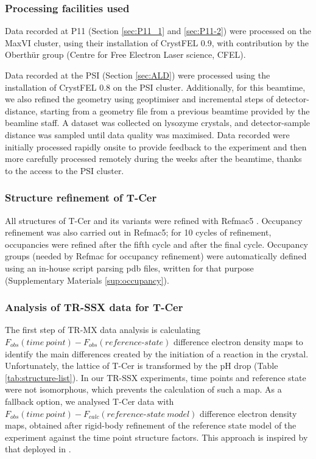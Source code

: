 \subsubsection{Processing facilities used}

Data recorded at P11 (Section \ref{sec:P11_1} and \ref{sec:P11-2}) were processed on the MaxVI cluster, using their installation of CrystFEL 0.9, with contribution by the Oberthür group (Centre for Free Electron Laser science, CFEL). 

Data recorded at the PSI (Section \ref{sec:ALD}) were processed using the installation of CrystFEL 0.8 on the PSI cluster. Additionally, for this beamtime, we also refined the geometry using geoptimiser and incremental steps of detector-distance, starting from a geometry file from a previous beamtime provided by the beamline staff. A dataset was collected on lysozyme crystals, and detector-sample distance was sampled until data quality was maximised. Data recorded were initially processed rapidly onsite to provide feedback to the experiment and then more carefully processed remotely during the weeks after the beamtime, thanks to the access to the PSI cluster.

\subsubsection{Structure refinement of T-Cer}
All structures of T-Cer and its variants were refined with Refmac5 \parencite{murshudovRefinementMacromolecularStructures1997}. Occupancy refinement was also carried out in Refmac5; for 10 cycles of refinement, occupancies were refined after the fifth cycle and after the final cycle. Occupancy groups (needed by Refmac for occupancy refinement) were automatically defined using an in-house script parsing pdb files, written for that purpose (Supplementary Materials \ref{sup:occupancy}).

\subsubsection{Analysis of TR-SSX data for T-Cer}\label{sec:TRSSXanalysis}
The first step of TR-MX data analysis is calculating \(F_{obs}(time\ point) - F_{obs}(reference\mbox{-}state)\) difference electron density maps to identify the main differences created by the initiation of a reaction in the crystal. Unfortunately, the lattice of T-Cer is transformed by the pH drop (Table \ref{tab:structure-list}). In our TR-SSX experiments, time points and reference state were not isomorphous, which prevents the calculation of such a map. As a fallback option, we analysed T-Cer data with \(F_{obs}(time\ point) - F_{calc}(reference\mbox{-}state\ model)\) difference electron density maps, obtained after rigid-body refinement of the reference state model of the experiment against the time point structure factors. This approach is inspired by that deployed in \cite{maestre-reynaSerialCrystallographyCaptures2022}. 

